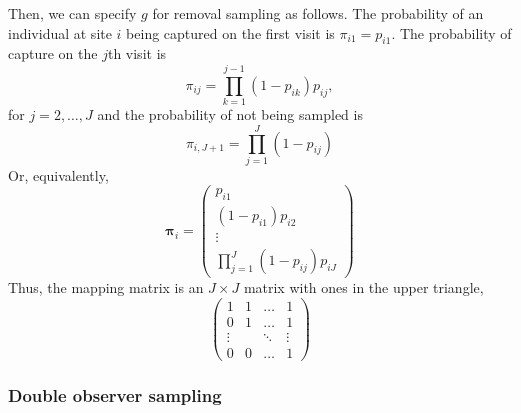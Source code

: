 \documentclass[article,shortnames]{jss}
\begin{document}
Then, we can specify $g$ for removal sampling as follows.  The
probability of an individual at site $i$ being captured on the first
visit is $\pi_{i1} = p_{i1}$.  The probability of capture on the $j$th
visit is
\begin{equation}
  \pi_{ij} = \prod_{k=1}^{j-1}(1 - p_{ik})p_{ij},
\end{equation}
for $j=2,\dots,J$ and the probability of not being sampled is
\begin{equation}
  \pi_{i,J+1} = \prod_{j=1}^{J}(1-p_{ij})
\end{equation}
Or, equivalently,
\begin{equation}
  \mathbf \pi_i =
  \begin{pmatrix}
    p_{i1} \\
    (1-p_{i1})p_{i2} \\
    \vdots \\
    \prod_{j=1}^J(1-p_{ij})p_{iJ}
  \end{pmatrix}
\end{equation}
Thus, the mapping matrix is an $J \times J$  matrix with ones in
the upper triangle,
\begin{equation}
  \begin{pmatrix}
    1 & 1 & \dots & 1 \\
    0 & 1 & \dots & 1 \\
    \vdots & & \ddots & \vdots \\
    0 & 0 & \dots  & 1
  \end{pmatrix}
\end{equation}


\subsubsection{Double observer sampling}
\label{sec:double-observ-sampl}
\end{document}
